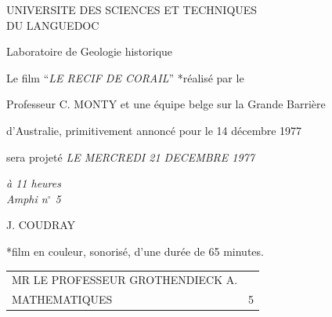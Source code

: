 \begin{center}
UNIVERSITE DES SCIENCES ET TECHNIQUES\\
DU LANGUEDOC

Laboratoire de Geologie historique
\end{center}

Le film ``\textit{LE RECIF DE CORAIL}'' *réalisé par le

Professeur C. MONTY et une équipe belge sur la Grande Barrière

d'Australie, primitivement annoncé pour le 14 décembre 1977

sera projeté \textit{LE MERCREDI 21 DECEMBRE 1977}

\begin{center}
\textit{à 11 heures}\\
\textit{Amphi n$^\circ$ 5}
\end{center}

\begin{flushright}J. COUDRAY\end{flushright}

*film en couleur, sonorisé, d'une durée de 65 minutes.

\begin{tabular}{ll}
MR LE PROFESSEUR GROTHENDIECK A.&\\[1em]
MATHEMATIQUES&5
\end{tabular}
